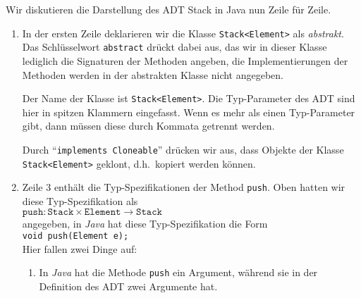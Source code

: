 Wir diskutieren die Darstellung des ADT Stack in Java nun Zeile f\"ur Zeile.
\begin{enumerate}
\item In der ersten Zeile deklarieren wir die Klasse \texttt{Stack<Element>} als
      \emph{abstrakt}.  Das Schl\"usselwort \texttt{abstract} dr\"uckt dabei aus,
      das wir in dieser Klasse lediglich die Signaturen der Methoden angeben,
      die Implementierungen der Methoden werden in der abstrakten Klasse
      nicht angegeben.

      Der Name der Klasse ist \texttt{Stack<Element>}.  Die Typ-Parameter des ADT 
      sind hier in spitzen Klammern eingefasst.  Wenn es mehr als einen Typ-Parameter gibt,
      dann m\"ussen diese durch Kommata getrennt werden.
      
      Durch  ``\texttt{implements Cloneable}'' dr\"ucken wir aus, 
      dass Objekte der Klasse \texttt{Stack<Element>} geklont, d.h.~kopiert werden k\"onnen.
\item Zeile 3 enth\"alt die Typ-Spezifikationen der Method \texttt{push}.
      Oben hatten wir diese Typ-Spezifikation als \\[0.1cm]
      \hspace*{1.3cm} 
      $\mathtt{push}: \mathtt{Stack} \times \mathtt{Element} \rightarrow \mathtt{Stack}$
      \\[0.1cm]
      angegeben, in \textsl{Java} hat diese Typ-Spezifikation die Form \\[0.1cm]
      \hspace*{1.3cm} \texttt{void push(Element e);} \\[0.1cm]
      Hier fallen zwei Dinge auf:
      \begin{enumerate}
      \item In \textsl{Java} hat die Methode \texttt{push} ein Argument,
            w\"ahrend sie in der Definition des ADT zwei Argumente hat.


\end{enumerate}
\end{enumerate}
